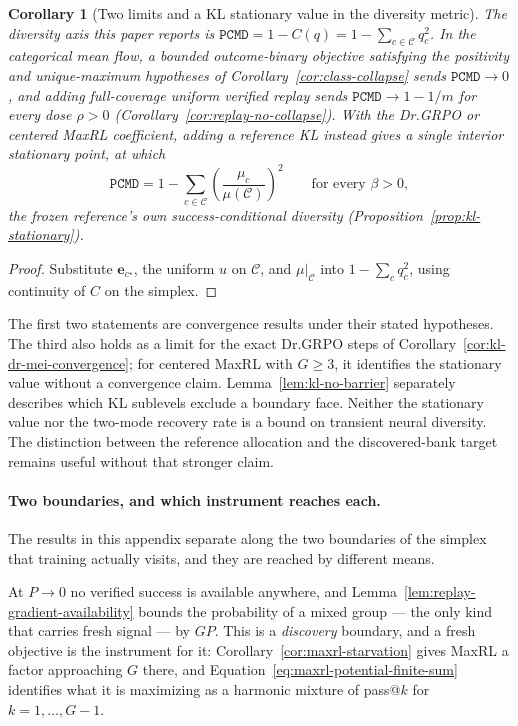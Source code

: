 \documentclass{article}
\newcommand{\enforcehalffinalproseline}{%
  \setlength{\parfillskip}{0pt plus .20\linewidth}}
\newcommand{\1}{\mathbf 1}
\newcommand{\pmd}{\texttt{PCMD}}
\newtheorem{corollary}[lemma]{Corollary}
\theoremstyle{remark}
\theoremstyle{definition}
\theoremstyle{plain}
\begin{document}
\begin{corollary}[Two limits and a KL stationary value in the diversity metric]
\enforcehalffinalproseline
\label{cor:pmd-limits}
The diversity axis this paper reports is
$\pmd{}=1-C(q)=1-\sum_{c\in\mathcal C}q_c^2$. In the categorical mean flow, a
bounded outcome-binary objective satisfying the positivity and unique-maximum
hypotheses of Corollary~\ref{cor:class-collapse} sends $\pmd{}\to0$, and adding full-coverage uniform verified
replay sends $\pmd{}\to1-1/m$ for every dose $\rho>0$
(Corollary~\ref{cor:replay-no-collapse}). With the Dr.GRPO or centered MaxRL coefficient, adding a reference KL
instead gives a single interior stationary point, at which
\[
 \pmd{}=1-\sum_{c\in\mathcal C}
   \left(\frac{\mu_c}{\mu(\mathcal C)}\right)^{\!2}
 \qquad\text{for every }\beta>0,
\]
the frozen reference's own success-conditional diversity
(Proposition~\ref{prop:kl-stationary}).
\end{corollary}

\begin{proof}
\enforcehalffinalproseline
Substitute $\mathbf e_{c^\star}$, the uniform $u$ on $\mathcal C$, and
$\mu|_{\mathcal C}$ into $1-\sum_cq_c^2$, using continuity of $C$ on the
simplex.
\end{proof}

The first two statements are convergence results under their stated
hypotheses. The third also holds as a limit for the exact Dr.GRPO steps of
Corollary~\ref{cor:kl-dr-mei-convergence}; for centered MaxRL with $G\ge3$,
it identifies the stationary value without a convergence claim.
Lemma~\ref{lem:kl-no-barrier} separately describes which KL sublevels
exclude a boundary face.
Neither the stationary value nor the two-mode recovery rate is a bound on
transient neural diversity. The distinction between the reference allocation
and the discovered-bank target remains useful without that stronger claim.

\paragraph{Two boundaries, and which instrument reaches each.}
The results in this appendix separate along the two boundaries of the simplex
that training actually visits, and they are reached by different means.

At $P\to0$ no verified success is available anywhere, and
Lemma~\ref{lem:replay-gradient-availability} bounds the probability of a
mixed group --- the only kind that carries fresh signal --- by $GP$. This is a
\emph{discovery} boundary, and a fresh objective is the instrument for it:
Corollary~\ref{cor:maxrl-starvation} gives MaxRL a factor approaching $G$
there, and Equation~\eqref{eq:maxrl-potential-finite-sum} identifies what it
is maximizing as a harmonic mixture of pass@$k$ for $k=1,\ldots,G-1$.
\end{document}
